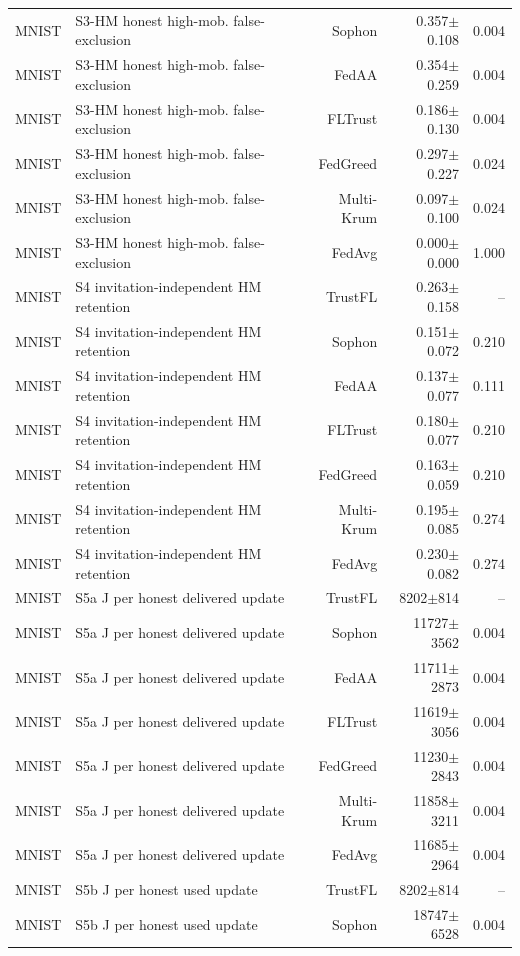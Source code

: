 \begin{tabular}{llrrr}
MNIST & S3-HM honest high-mob. false-exclusion & Sophon & 0.357$\pm$0.108 & 0.004 \\
MNIST & S3-HM honest high-mob. false-exclusion & FedAA & 0.354$\pm$0.259 & 0.004 \\
MNIST & S3-HM honest high-mob. false-exclusion & FLTrust & 0.186$\pm$0.130 & 0.004 \\
MNIST & S3-HM honest high-mob. false-exclusion & FedGreed & 0.297$\pm$0.227 & 0.024 \\
MNIST & S3-HM honest high-mob. false-exclusion & Multi-Krum & 0.097$\pm$0.100 & 0.024 \\
MNIST & S3-HM honest high-mob. false-exclusion & FedAvg & 0.000$\pm$0.000 & 1.000 \\
MNIST & S4 invitation-independent HM retention & TrustFL & 0.263$\pm$0.158 & -- \\
MNIST & S4 invitation-independent HM retention & Sophon & 0.151$\pm$0.072 & 0.210 \\
MNIST & S4 invitation-independent HM retention & FedAA & 0.137$\pm$0.077 & 0.111 \\
MNIST & S4 invitation-independent HM retention & FLTrust & 0.180$\pm$0.077 & 0.210 \\
MNIST & S4 invitation-independent HM retention & FedGreed & 0.163$\pm$0.059 & 0.210 \\
MNIST & S4 invitation-independent HM retention & Multi-Krum & 0.195$\pm$0.085 & 0.274 \\
MNIST & S4 invitation-independent HM retention & FedAvg & 0.230$\pm$0.082 & 0.274 \\
MNIST & S5a J per honest delivered update & TrustFL & 8202$\pm$814 & -- \\
MNIST & S5a J per honest delivered update & Sophon & 11727$\pm$3562 & 0.004 \\
MNIST & S5a J per honest delivered update & FedAA & 11711$\pm$2873 & 0.004 \\
MNIST & S5a J per honest delivered update & FLTrust & 11619$\pm$3056 & 0.004 \\
MNIST & S5a J per honest delivered update & FedGreed & 11230$\pm$2843 & 0.004 \\
MNIST & S5a J per honest delivered update & Multi-Krum & 11858$\pm$3211 & 0.004 \\
MNIST & S5a J per honest delivered update & FedAvg & 11685$\pm$2964 & 0.004 \\
MNIST & S5b J per honest used update & TrustFL & 8202$\pm$814 & -- \\
MNIST & S5b J per honest used update & Sophon & 18747$\pm$6528 & 0.004 \\

\end{tabular}

